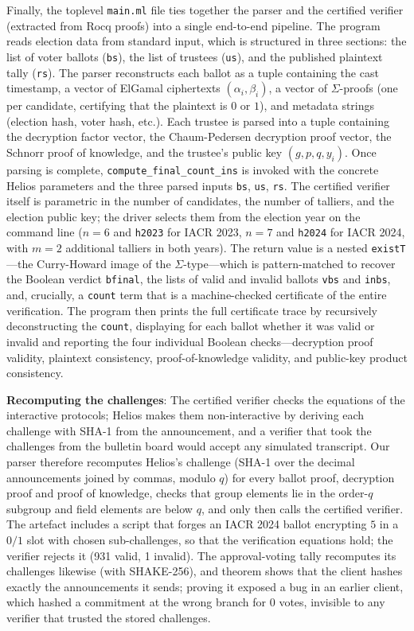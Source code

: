 \documentclass[sigconf,anonymous,review]{acmart}
\begin{document}
Finally, the toplevel \texttt{main.ml} file ties together the parser
and the certified verifier (extracted from Rocq proofs) into a single end-to-end pipeline.
The program reads election data from standard input, which is structured
in three sections: the list of voter ballots
(\texttt{bs}), the list of trustees (\texttt{us}), and the published
plaintext tally (\texttt{rs}).
The parser reconstructs each ballot as a tuple containing the cast timestamp,
a vector of ElGamal ciphertexts $(\alpha_i, \beta_i)$, a vector of $\Sigma$-proofs (one per candidate, certifying that the plaintext is $0$ or $1$),
and metadata strings (election hash, voter hash, etc.).
Each trustee is parsed into a tuple containing the decryption factor vector,
the Chaum-Pedersen decryption proof vector, the Schnorr proof of knowledge,
and the trustee's public key $(g, p, q, y_i)$. Once parsing is complete, \texttt{compute\_final\_count\_ins} is invoked
with the concrete Helios parameters and the three parsed inputs
\texttt{bs}, \texttt{us}, \texttt{rs}. The certified verifier itself is
parametric in the number of candidates, the number of talliers, and the
election public key; the driver selects them from the election year on the
command line ($n = 6$ and \texttt{h2023} for IACR 2023, $n = 7$ and
\texttt{h2024} for IACR 2024, with $m = 2$ additional talliers in both years).
The return value is a nested \texttt{existT}---the Curry-Howard
image of the $\Sigma$-type---which is pattern-matched to recover the
Boolean verdict \texttt{bfinal}, the lists of valid and invalid ballots
\texttt{vbs} and \texttt{inbs}, and, crucially, a \texttt{count} term
that is a machine-checked certificate of the entire verification.
The program then prints the full certificate trace by
recursively deconstructing the \texttt{count}, displaying for
each ballot whether it was valid or invalid and reporting the four individual Boolean checks---decryption proof
validity, plaintext consistency, proof-of-knowledge validity, and public-key product consistency.

\textbf{Recomputing the challenges}: The certified verifier checks the equations of the interactive protocols; Helios makes them non-interactive by deriving each challenge with SHA-1 from the announcement, and a verifier that took the challenges from the bulletin board would accept any simulated transcript. Our parser therefore recomputes Helios's challenge (SHA-1 over the decimal announcements joined by commas, modulo $q$) for every ballot proof, decryption proof and proof of knowledge, checks that group elements lie in the order-$q$ subgroup and field elements are below $q$, and only then calls the certified verifier. The artefact includes a script that forges an IACR 2024 ballot encrypting $5$ in a $0/1$ slot with chosen sub-challenges, so that the verification equations hold; the verifier rejects it (931 valid, 1 invalid). The approval-voting tally recomputes its challenges likewise (with SHAKE-256), and theorem \texttt{} shows that the client hashes exactly the announcements it sends; proving it exposed a bug in an earlier client, which hashed a commitment at the wrong branch for $0$ votes, invisible to any verifier that trusted the stored challenges.
\end{document}
